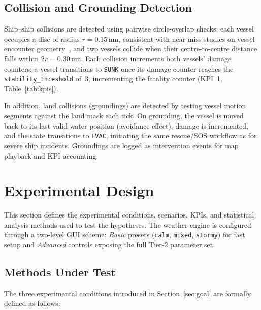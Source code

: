 \documentclass[cameraready]{Interspeech}
\begin{document}
\subsection{Collision and Grounding Detection}

Ship--ship collisions are detected using pairwise circle-overlap checks: each vessel occupies a disc of radius $r = 0.15$\,nm, consistent with near-miss studies on vessel encounter geometry~\cite{zhang2015}, and two vessels collide when their centre-to-centre distance falls within $2r = 0.30$\,nm. Each collision increments both vessels' damage counters; a vessel transitions to \texttt{SUNK} once its damage counter reaches the \texttt{stability\_threshold} of~3, incrementing the fatality counter (KPI~1, Table~\ref{tab:kpis}).

In addition, land collisions (groundings) are detected by testing vessel motion segments against the land mask each tick. On grounding, the vessel is moved back to its last valid water position (avoidance effect), damage is incremented, and the state transitions to \texttt{EVAC}, initiating the same rescue/SOS workflow as for severe ship incidents. Groundings are logged as intervention events for map playback and KPI accounting.

\section{Experimental Design}
\label{sec:experiment}

This section defines the experimental conditions, scenarios, KPIs, and statistical analysis methods used to test the hypotheses. The weather engine is configured through a two-level GUI scheme: \emph{Basic} presets (\texttt{calm}, \texttt{mixed}, \texttt{stormy}) for fast setup and \emph{Advanced} controls exposing the full Tier-2 parameter set.

\subsection{Methods Under Test}

The three experimental conditions introduced in Section~\ref{sec:goal} are formally defined as follows:
\end{document}
